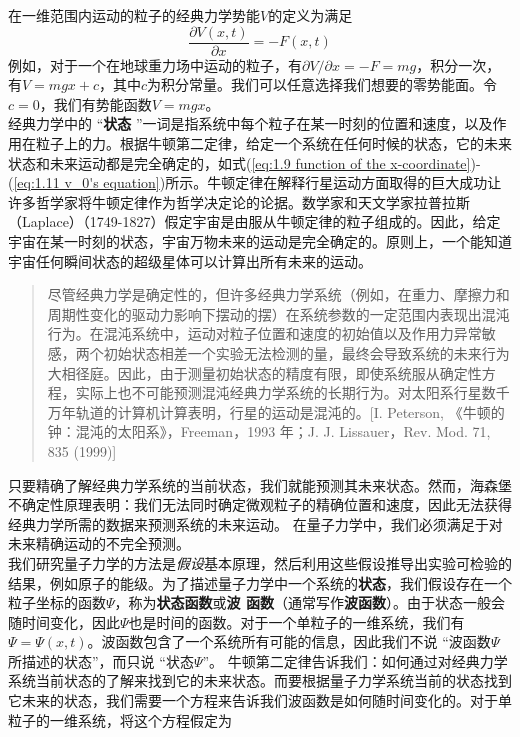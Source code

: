 	 \indent 在一维范围内运动的粒子的经典力学势能$V$的定义为满足
	 \begin{equation}
	 	\boxed{\frac{\partial V \left(x,t\right)}{\partial x} = -F\left(x,t\right)}
	 	\label{eq:1.12 Potential energy in classical mechanics}
	 \end{equation}
	 例如，对于一个在地球重力场中运动的粒子，有$\partial V / \partial x = -F = mg$，积分一次，有$V = mgx+c$，其中$c$为积分常量。我们可以任意选择我们想要的零势能面。令$c=0$，我们有势能函数$V=mgx$。\\
	 \indent 经典力学中的 “\textbf{状态} ”一词是指系统中每个粒子在某一时刻的位置和速度，以及作用在粒子上的力。根据牛顿第二定律，给定一个系统在任何时候的状态，它的未来状态和未来运动都是完全确定的，如式(\ref{eq:1.9 function of the x-coordinate})-(\ref{eq:1.11 v_0's equation})所示。牛顿定律在解释行星运动方面取得的巨大成功让许多哲学家将牛顿定律作为哲学决定论的论据。数学家和天文学家拉普拉斯（Laplace）（1749-1827）假定宇宙是由服从牛顿定律的粒子组成的。因此，给定宇宙在某一时刻的状态，宇宙万物未来的运动是完全确定的。原则上，一个能知道宇宙任何瞬间状态的超级星体可以计算出所有未来的运动。
	\begin{quote}
		\small %
		\noindent %
		尽管经典力学是确定性的，但许多经典力学系统（例如，在重力、摩擦力和周期性变化的驱动力影响下摆动的摆）在系统参数的一定范围内表现出混沌行为。在混沌系统中，运动对粒子位置和速度的初始值以及作用力异常敏感，两个初始状态相差一个实验无法检测的量，最终会导致系统的未来行为大相径庭。因此，由于测量初始状态的精度有限，即使系统服从确定性方程，实际上也不可能预测混沌经典力学系统的长期行为。对太阳系行星数千万年轨道的计算机计算表明，行星的运动是混沌的。[I. Peterson, 《牛顿的钟：混沌的太阳系》，Freeman，1993 年；J. J. Lissauer，Rev. Mod. 71, 835 (1999)]
	\end{quote}
	\indent 
	\indent 只要精确了解经典力学系统的当前状态，我们就能预测其未来状态。然而，海森堡不确定性原理表明：我们无法同时确定微观粒子的精确位置和速度，因此无法获得经典力学所需的数据来预测系统的未来运动。 在量子力学中，我们必须满足于对未来精确运动的不完全预测。\\
	\indent 我们研究量子力学的方法是\textit{假设}基本原理，然后利用这些假设推导出实验可检验的结果，例如原子的能级。为了描述量子力学中一个系统的\textbf{状态}，我们假设存在一个粒子坐标的函数$\Psi$，称为\textbf{状态函数}或\textbf{波 函数}（通常写作\textbf{波函数}）。由于状态一般会随时间变化，因此$\Psi$也是时间的函数。对于一个单粒子的一维系统，我们有$\Psi=\Psi\left(x,t\right)$。波函数包含了一个系统所有可能的信息，因此我们不说 “波函数$\Psi$所描述的状态”，而只说 “状态$\Psi$”。 牛顿第二定律告诉我们：如何通过对经典力学系统当前状态的了解来找到它的未来状态。而要根据量子力学系统当前的状态找到它未来的状态，我们需要一个方程来告诉我们波函数是如何随时间变化的。对于单粒子的一维系统，将这个方程假定为
